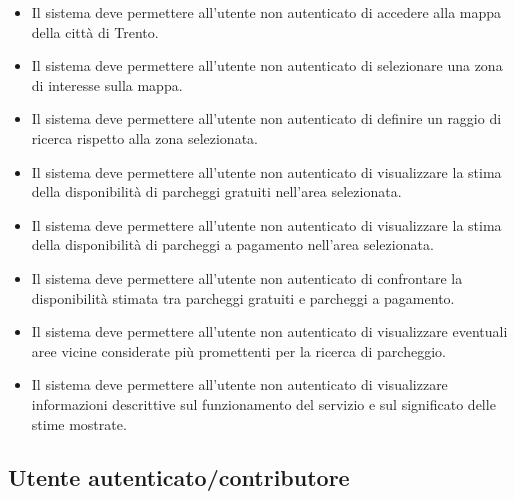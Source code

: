 \documentclass[a4paper,12pt]{article}
\begin{document}
\begin{itemize}[leftmargin=2cm]
    \item[\textbf{RF1:}] Il sistema deve permettere all'utente non autenticato di accedere alla mappa della città di Trento.
    \item[\textbf{RF2:}] Il sistema deve permettere all'utente non autenticato di selezionare una zona di interesse sulla mappa.
    \item[\textbf{RF3:}] Il sistema deve permettere all'utente non autenticato di definire un raggio di ricerca rispetto alla zona selezionata.
    \item[\textbf{RF4:}] Il sistema deve permettere all'utente non autenticato di visualizzare la stima della disponibilità di parcheggi gratuiti nell'area selezionata.
    \item[\textbf{RF5:}] Il sistema deve permettere all'utente non autenticato di visualizzare la stima della disponibilità di parcheggi a pagamento nell'area selezionata.
    \item[\textbf{RF6:}] Il sistema deve permettere all'utente non autenticato di confrontare la disponibilità stimata tra parcheggi gratuiti e parcheggi a pagamento.
    \item[\textbf{RF7:}] Il sistema deve permettere all'utente non autenticato di visualizzare eventuali aree vicine considerate più promettenti per la ricerca di parcheggio.
    \item[\textbf{RF8:}] Il sistema deve permettere all'utente non autenticato di visualizzare informazioni descrittive sul funzionamento del servizio e sul significato delle stime mostrate.
\end{itemize}

\subsection{Utente autenticato/contributore}
\end{document}
